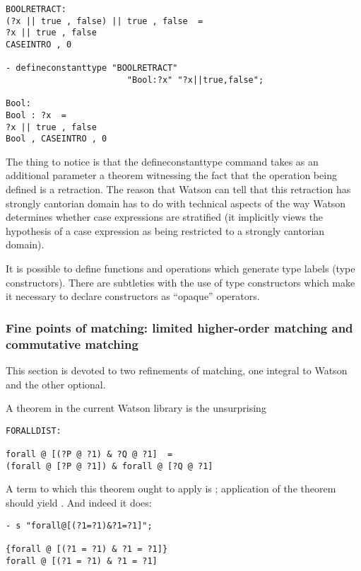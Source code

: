 \documentclass{kluwer}
\begin{document}
\begin{article}
\begin{verbatim}
BOOLRETRACT:  
(?x || true , false) || true , false  =  
?x || true , false
CASEINTRO , 0

- defineconstanttype "BOOLRETRACT" 
                        "Bool:?x" "?x||true,false";

Bool:  
Bool : ?x  =  
?x || true , false
Bool , CASEINTRO , 0
\end{verbatim}

The thing to notice is that the defineconstanttype command takes as an
additional parameter a theorem witnessing the fact that the operation
being defined is a retraction.  The reason that Watson can tell that
this retraction has strongly cantorian domain has to do with technical
aspects of the way Watson determines whether case expressions are
stratified (it implicitly views the hypothesis of a case expression as
being restricted to a strongly cantorian domain).

It is possible to define functions and operations which generate type
labels (type constructors).  There are subtleties with the use of type
constructors which make it necessary to declare constructors as ``opaque''
operators.

\subsubsection{Fine points of matching:  limited higher-order matching and commutative matching}

This section is devoted to two refinements of matching, one integral to
Watson and the other optional.

A theorem in the current Watson library is the unsurprising


\begin{verbatim}
FORALLDIST:  

forall @ [(?P @ ?1) & ?Q @ ?1]  =  
(forall @ [?P @ ?1]) & forall @ [?Q @ ?1]
\end{verbatim}

A term to which this theorem ought to apply is ;
application of the theorem should yield .
And indeed it does:

\begin{verbatim}
- s "forall@[(?1=?1)&?1=?1]";

{forall @ [(?1 = ?1) & ?1 = ?1]}
forall @ [(?1 = ?1) & ?1 = ?1]


\end{verbatim}
\end{article}
\end{document}
